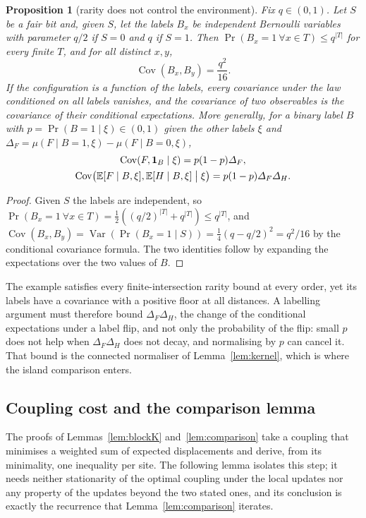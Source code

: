 \documentclass[11pt]{amsart}
\newtheorem{proposition}[theorem]{Proposition}
\theoremstyle{definition}
\theoremstyle{remark}
\numberwithin{equation}{section}
\newcommand{\E}{\mathbb{E}}
\newcommand{\Cov}{\operatorname{Cov}}
\newcommand{\Var}{\operatorname{Var}}
\begin{document}
\begin{proposition}[rarity does not control the environment]\label{prop:hiddenbit}
Fix $q\in(0,1)$. Let $S$ be a fair bit and, given $S$, let the labels $B_x$
be independent Bernoulli variables with parameter $q/2$ if $S=0$ and $q$
if $S=1$. Then $\Pr(B_x=1\ \forall x\in T)\le q^{|T|}$ for every finite
$T$, and for all distinct $x,y$,
\[
\Cov(B_x,B_y)=\frac{q^2}{16} .
\]
If the configuration is a function of the labels, every covariance under
the law conditioned on all labels vanishes, and the covariance of two
observables is the covariance of their conditional expectations. More
generally, for a binary label $B$ with $p=\Pr(B=1\mid\xi)\in(0,1)$ given
the other labels $\xi$ and $\varDelta_F=\mu(F\mid B=1,\xi)-\mu(F\mid
B=0,\xi)$,
\[
\begin{gathered}
\Cov(F,\mathbf 1_B\mid\xi)=p(1-p)\varDelta_F,\\
\Cov\bigl(\E[F\mid B,\xi],\E[H\mid B,\xi]\bigm|\xi\bigr)=p(1-p)\varDelta_F
\varDelta_H .
\end{gathered}
\]
\end{proposition}

\begin{proof}
Given $S$ the labels are independent, so $\Pr(B_x=1\ \forall x\in T)=
\frac12((q/2)^{|T|}+q^{|T|})\le q^{|T|}$, and $\Cov(B_x,B_y)=\Var(\Pr(B_x=
1\mid S))=\frac14(q-q/2)^2=q^2/16$ by the conditional covariance formula.
The two identities follow by expanding the expectations over the two
values of $B$.
\end{proof}

The example satisfies every finite-intersection rarity bound at every
order, yet its labels have a covariance with a positive floor at all
distances. A labelling argument must therefore bound $\varDelta_F
\varDelta_H$, the change of the conditional expectations under a label
flip, and not only the probability of the flip: small $p$ does not help
when $\varDelta_F\varDelta_H$ does not decay, and normalising by $p$ can
cancel it. That bound is the connected normaliser of
Lemma~\ref{lem:kernel}, which is where the island comparison enters.

\subsection{Coupling cost and the comparison lemma}\label{ssec:couplingcost}

The proofs of Lemmas~\ref{lem:blockK} and~\ref{lem:comparison} take a
coupling that minimises a weighted sum of expected displacements and
derive, from its minimality, one inequality per site. The following lemma
isolates this step; it needs neither stationarity of the optimal coupling
under the local updates nor any property of the updates beyond the two
stated ones, and its conclusion is exactly the recurrence that
Lemma~\ref{lem:comparison} iterates.
\end{document}
